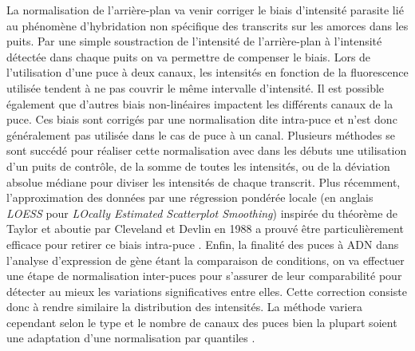 
La normalisation de l'arrière-plan va venir corriger le biais d'intensité parasite lié au phénomène d'hybridation non spécifique des transcrits sur les amorces dans les puits. Par une simple soustraction de l'intensité de l'arrière-plan à l'intensité détectée dans chaque puits on va permettre de compenser le biais. Lors de l'utilisation d'une puce à deux canaux, les intensités en fonction de la fluorescence utilisée tendent à ne pas couvrir le même intervalle d'intensité. Il est possible également que d'autres biais non-linéaires impactent les différents canaux de la puce. Ces biais sont corrigés par une normalisation dite intra-puce et n'est donc généralement pas utilisée dans le cas de puce à un canal. Plusieurs méthodes se sont succédé pour réaliser cette normalisation avec dans les débuts une utilisation d'un puits de contrôle, de la somme de toutes les intensités, ou de la déviation absolue médiane pour diviser les intensités de chaque transcrit. Plus récemment, l'approximation des données par une régression pondérée locale (en anglais \textit{LOESS} pour \textit{LOcally Estimated Scatterplot Smoothing}) inspirée du théorème de Taylor et aboutie par Cleveland et Devlin en 1988 \cite{Cleveland1988Sep} a prouvé être particulièrement efficace pour retirer ce biais intra-puce \cite{Smyth2003Dec}. Enfin, la finalité des puces à ADN dans l'analyse d'expression de gène étant la comparaison de conditions, on va effectuer une étape de normalisation inter-puces pour s'assurer de leur comparabilité pour détecter au mieux les variations significatives entre elles. Cette correction consiste donc à rendre similaire la distribution des intensités. La méthode variera cependant selon le type et le nombre de canaux des puces bien la plupart soient une adaptation d'une normalisation par quantiles \cite{Ritchie2015Apr}. \\

